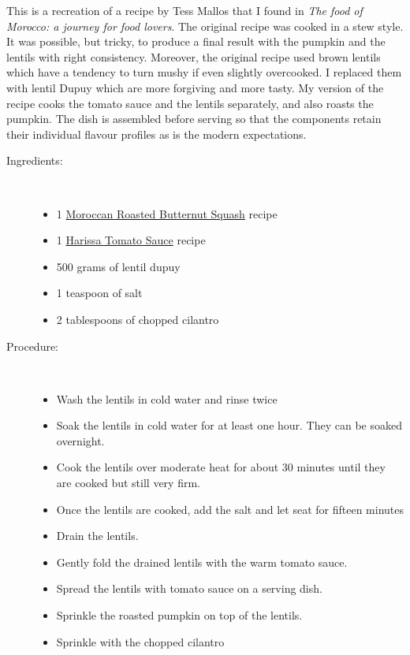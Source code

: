 \documentclass[11pt,letterpaper]{article}
\begin{document}


This is a recreation of a recipe by Tess Mallos that I found in {\it The food of Morocco: a journey for food lovers}. The original recipe was cooked in a stew style. It was possible, but tricky, to produce a final result with the pumpkin and the lentils with right consistency. Moreover, the original recipe used brown lentils which have a tendency to turn mushy if even slightly overcooked. I replaced them with lentil Dupuy which are more forgiving and more tasty. My version of the recipe cooks the tomato sauce and the lentils separately, and also roasts the pumpkin. The dish is assembled before serving so that the components retain their individual flavour profiles as is the modern expectations.

\begin{description}

\item[Ingredients:]\ \\
	\begin{itemize}
	\item 1 \href{MoroccanRoastedButternutSquash.html}{Moroccan Roasted Butternut Squash} recipe
	\item 1 \href{HarissaTomatoSauce.html}{Harissa Tomato Sauce} recipe
	\item 500 grams of lentil dupuy 
	\item 1 teaspoon of salt
	\item 2 tablespoons of chopped cilantro
	\end{itemize}

\item[Procedure:]\ \\
	\begin{itemize}
	\item Wash the lentils in cold water and rinse twice 
	\item Soak the lentils in cold water for at least one hour. They can be soaked overnight.
	\item Cook the lentils over moderate heat for about 30 minutes until they are cooked but still very firm. 
	\item Once the lentils are cooked, add the salt and let seat for fifteen minutes
	\item Drain the lentils.
	\item Gently fold the drained lentils with the warm tomato sauce.
	\item Spread the lentils with tomato sauce on a serving dish.
	\item Sprinkle the roasted pumpkin on top of the lentils.
	\item Sprinkle with the chopped cilantro
	\end{itemize}
\end{description}
\end{document}

